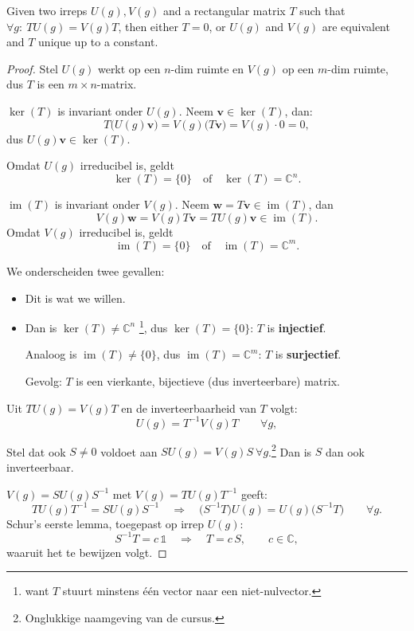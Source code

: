 \begin{theorem}
    Given two irreps \(U(g), V(g)\) and a rectangular matrix \(T\) such that \(\forall g : \ TU(g) = V(g)T\),
    then either \(T = 0\), or \(U(g)\) and \(V(g)\) are equivalent and \(T\) unique up to a constant.
\end{theorem}

\begin{proof}
    Stel \(U(g)\) werkt op een \(n\)-dim ruimte en \(V(g)\) op een \(m\)-dim ruimte, dus \(T\) is een \(m \times n\)-matrix.

    \(\ker (T)\) is invariant onder \(U(g)\). Neem \(\bm v \in \ker (T)\), dan:
    \[
        T\big(U(g) \bm v\big) = V(g)\big(T \bm v\big) = V(g)\cdot 0 = 0,
    \]
    dus \(U(g) \bm v \in \ker (T)\).

    Omdat \(U(g)\) irreducibel is, geldt
    \[
        \ker (T) = \{0\} \quad \text{of} \quad \ker (T) = \mathbb{C}^n.
    \]

    \(\operatorname{im} (T)\) is invariant onder \(V(g)\). Neem \(\bm w = T \bm v \in \operatorname{im} (T)\), dan
    \[
        V(g) \bm w = V(g)T \bm v = T U(g) \bm v \in \operatorname{im} (T).
    \]
    Omdat \(V(g)\) irreducibel is, geldt
    \[
        \operatorname{im} (T) = \{0\} \quad \text{of} \quad \operatorname{im} (T) = \mathbb{C}^m.
    \]

    We onderscheiden twee gevallen:
    \begin{itemize}
        \item[\(T = 0\):] Dit is wat we willen.
        \item [\(T \neq 0\):] Dan is \(\ker (T) \neq \mathbb{C}^n\) \footnote{want \(T\) stuurt minstens één vector naar een niet-nulvector.},
        dus \(\ker (T) = \{0\}\): \(T\) is \textbf{injectief}.

        Analoog is \(\operatorname{im} (T) \neq \{0\}\), dus \(\operatorname{im} (T) = \mathbb{C}^m\): \(T\) is \textbf{surjectief}.

        Gevolg: \(T\) is een vierkante, bijectieve (dus inverteerbare) matrix.
    \end{itemize}

   Uit \(TU(g) = V(g)T\) en de inverteerbaarheid van \(T\) volgt:
    \[
        U(g) = T^{-1}V(g)T \qquad \forall g,
    \]

    Stel dat ook \(S \neq 0\) voldoet aan \(SU(g) = V(g)S \ \forall g\).\footnote{Onglukkige naamgeving van de cursus.}
    Dan is \(S\) dan ook inverteerbaar.

    \(V(g) = SU(g)S^{-1}\) met \(V(g) = TU(g)T^{-1}\) geeft:
    \[
        TU(g)T^{-1} = SU(g)S^{-1} \quad\Longrightarrow\quad \big(S^{-1}T\big)U(g) = U(g)\big(S^{-1}T\big) \qquad \forall g.
    \]
    Schur's eerste lemma, toegepast op irrep \(U(g)\):
    \[
        S^{-1}T = c\,\mathds{1} \quad\Longrightarrow\quad T = c\,S, \qquad c \in \mathbb{C},
    \]
    waaruit het te bewijzen volgt.
\end{proof}
